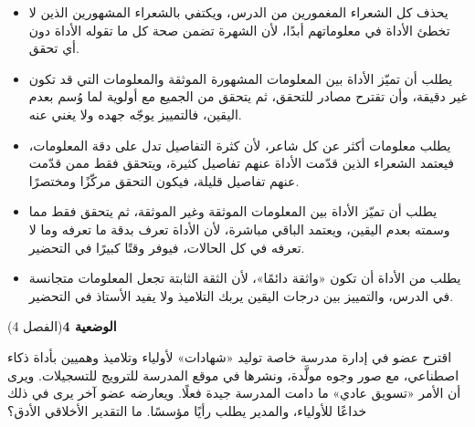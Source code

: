 \documentclass[11pt,a4paper]{article}
\begin{document}
\begin{itemize}[leftmargin=1.0cm, labelsep=6pt, itemsep=3pt, topsep=4pt, parsep=0pt]
  \item[\textbf{أ)}] يحذف كل الشعراء المغمورين من الدرس، ويكتفي بالشعراء المشهورين الذين لا تخطئ الأداة في معلوماتهم أبدًا، لأن الشهرة تضمن صحة كل ما تقوله الأداة دون أي تحقق.
  \item[\textbf{ب)}] يطلب أن تميّز الأداة بين المعلومات المشهورة الموثقة والمعلومات التي قد تكون غير دقيقة، وأن تقترح مصادر للتحقق، ثم يتحقق من الجميع مع أولوية لما وُسم بعدم اليقين، فالتمييز يوجّه جهده ولا يغني عنه.
  \item[\textbf{ج)}] يطلب معلومات أكثر عن كل شاعر، لأن كثرة التفاصيل تدل على دقة المعلومات، فيعتمد الشعراء الذين قدّمت الأداة عنهم تفاصيل كثيرة، ويتحقق فقط ممن قدّمت عنهم تفاصيل قليلة، فيكون التحقق مركّزًا ومختصرًا.
  \item[\textbf{د)}] يطلب أن تميّز الأداة بين المعلومات الموثقة وغير الموثقة، ثم يتحقق فقط مما وسمته بعدم اليقين، ويعتمد الباقي مباشرة، لأن الأداة تعرف بدقة ما تعرفه وما لا تعرفه في كل الحالات، فيوفر وقتًا كبيرًا في التحضير.
  \item[\textbf{هـ)}] يطلب من الأداة أن تكون «واثقة دائمًا»، لأن الثقة الثابتة تجعل المعلومات متجانسة في الدرس، والتمييز بين درجات اليقين يربك التلاميذ ولا يفيد الأستاذ في التحضير.
\end{itemize}
\par\vspace{6pt}
\noindent
{\large\khatt\textbf{الوضعية 4}}\hfill{\small(الفصل 4)}\par\nopagebreak\vspace{3pt}
\setlength{\fboxsep}{7pt}\colorbox{gray!10}{\parbox{\dimexpr\linewidth-14pt}{اقترح عضو في إدارة مدرسة خاصة توليد «شهادات» لأولياء وتلاميذ وهميين بأداة ذكاء اصطناعي، مع صور وجوه مولَّدة، ونشرها في موقع المدرسة للترويج للتسجيلات. ويرى أن الأمر «تسويق عادي» ما دامت المدرسة جيدة فعلًا. ويعارضه عضو آخر يرى في ذلك خداعًا للأولياء، والمدير يطلب رأيًا مؤسسًا. ما التقدير الأخلاقي الأدق؟}}\par\nopagebreak
\end{document}
